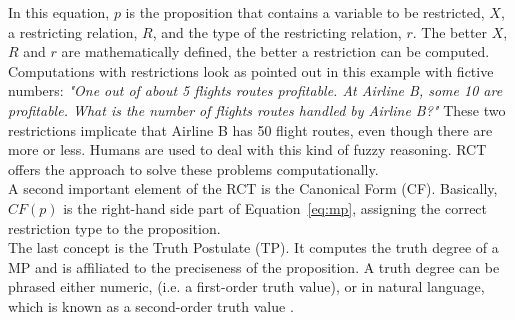 \documentclass[conference]{IEEEtran}
\begin{document}
In this equation, \begin{math} p \end{math} is the proposition that contains a variable to be restricted, \begin{math} X \end{math}, a restricting relation, \begin{math} R \end{math}, and the type of the restricting relation, \begin{math} r \end{math}. The better \begin{math} X \end{math}, \begin{math} R \end{math} and \begin{math} r \end{math} are mathematically defined, the better a restriction can be computed. Computations with restrictions look as pointed out in this example with fictive numbers: \emph{"One out of about 5 flights routes profitable. At Airline B, some 10 are profitable. What is the number of flights routes handled by Airline B?"} These two restrictions implicate that Airline B has 50 flight routes, even though there are more or less. Humans are used to deal with this kind of fuzzy reasoning. RCT offers the approach to solve these problems computationally.\\
A second important element of the RCT is the Canonical Form (CF). Basically, \begin{math} CF(p) \end{math} is the right-hand side part of Equation~\ref{eq:mp}, assigning the correct restriction type to the proposition.\\
The last concept is the Truth Postulate (TP). It computes the truth degree of a MP and is affiliated to the preciseness of the proposition. A truth degree can be phrased either numeric, (i.e. a first-order truth value), or in natural language, which is known as a second-order truth value \cite{zadeh2013}.
\end{document}
